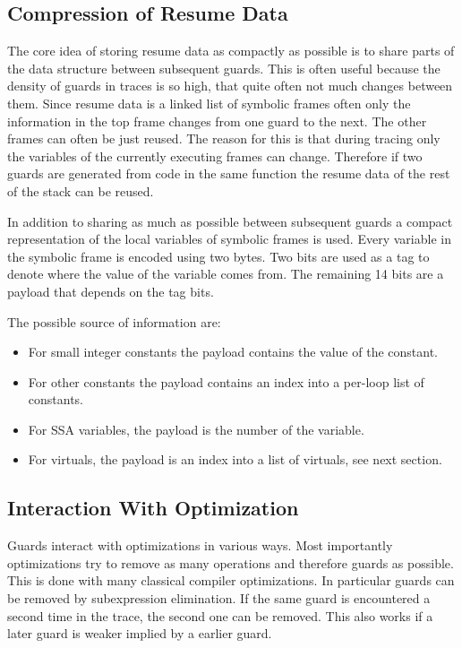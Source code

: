 \documentclass[10pt,preprint]{sigplanconf}
\begin{document}
\subsection{Compression of Resume Data}
\label{sub:compression}

The core idea of storing resume data as compactly as possible
is to share parts of the data structure between subsequent guards.
This is often useful because the density of guards in traces is so high,
that quite often not much changes between them.
Since resume data is a linked list of symbolic frames
often only the information in the top frame changes from one guard to the next.
The other frames can often be just reused.
The reason for this is that during tracing only the variables
of the currently executing frames can change.
Therefore if two guards are generated from code in the same function
the resume data of the rest of the stack can be reused.

In addition to sharing as much as possible between subsequent guards
a compact representation of the local variables of symbolic frames is used.
Every variable in the symbolic frame is encoded using two bytes.
Two bits are used as a tag to denote where the value of the variable
comes from.
The remaining 14 bits are a payload that depends on the tag bits.

The possible source of information are:

\begin{itemize}
    \item For small integer constants
        the payload contains the value of the constant.
    \item For other constants
        the payload contains an index into a per-loop list of constants.
    \item For SSA variables,
        the payload is the number of the variable.
    \item For virtuals,
        the payload is an index into a list of virtuals, see next section.
\end{itemize}

\subsection{Interaction With Optimization}
\label{sub:optimization}

Guards interact with optimizations in various ways.
Most importantly optimizations try to remove as many operations
and therefore guards as possible.
This is done with many classical compiler optimizations.
In particular guards can be removed by subexpression elimination.
If the same guard is encountered a second time in the trace,
the second one can be removed.
This also works if a later guard is weaker implied by a earlier guard.
\end{document}
